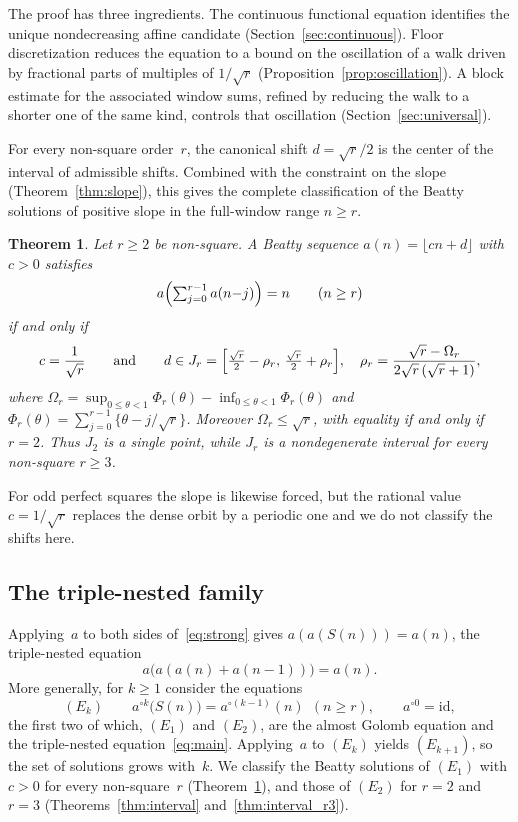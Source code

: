 \documentclass{birkjour}
\newtheorem{theorem}{Theorem}
\theoremstyle{definition}
\theoremstyle{remark}
\newcommand{\fl}[1]{\lfloor #1 \rfloor}
\begin{document}
The proof has three ingredients.
The continuous functional equation
identifies the unique nondecreasing affine candidate
(Section~\ref{sec:continuous}).
Floor discretization reduces the equation
to a bound on the oscillation of a walk driven by fractional
parts of multiples of $1/\!\sqrt{r}$
(Proposition~\ref{prop:oscillation}).
A block estimate for the associated window sums, refined by
reducing the walk to a shorter one of the same kind, controls
that oscillation
(Section~\ref{sec:universal}).

For every non-square order~$r$, the canonical shift
$d=\sqrt{r}/2$ is the center of the interval of admissible
shifts. Combined with the constraint on the slope
(Theorem~\ref{thm:slope}), this gives the complete
classification of the Beatty solutions of positive slope in
the full-window range $n\ge r$.

\begin{theorem}\label{thm:shift_interval}
Let $r\ge 2$ be non-square. A
Beatty sequence $a(n)=\fl{cn+d}$ with $c>0$ satisfies
\[
  a\Bigl(\textstyle\sum_{j=0}^{r-1}a(n{-}j)\Bigr)=n
  \qquad(n\ge r)
\]
if and only if
\[
  c=\frac{1}{\sqrt{r}}
  \qquad\text{and}\qquad
  d\in J_{r}
  =\Bigl[\tfrac{\sqrt{r}}{2}-\rho_{r},\,
         \tfrac{\sqrt{r}}{2}+\rho_{r}\Bigr],
  \quad
  \rho_{r}=\frac{\sqrt{r}-\Omega_{r}}{2\sqrt{r}\,(\sqrt{r}+1)},
\]
where $\Omega_{r}=\sup_{0\le\theta<1}\Phi_{r}(\theta)
-\inf_{0\le\theta<1}\Phi_{r}(\theta)$ and
$\Phi_{r}(\theta)=\sum_{j=0}^{r-1}\{\theta-j/\!\sqrt{r}\}$.
Moreover $\Omega_{r}\le\sqrt{r}$, with equality if and only if
$r=2$. Thus $J_{2}$ is a single point, while $J_{r}$ is a
nondegenerate interval for every non-square $r\ge 3$.
\end{theorem}

For odd perfect squares the slope is likewise forced, but the
rational value $c=1/\!\sqrt{r}$ replaces the dense orbit by a
periodic one and we do not classify the shifts here.

\subsection{The triple-nested family}

Applying~$a$ to both sides of~\eqref{eq:strong}
gives $a(a(S(n)))=a(n)$, the triple-nested equation
\begin{equation}\label{eq:main}
  a\bigl(a(a(n)+a(n{-}1))\bigr)=a(n).
\end{equation}
More generally, for $k\ge 1$ consider the equations
\begin{equation}\label{eq:Ek}
  (E_{k})\qquad a^{\circ k}\bigl(S(n)\bigr)=a^{\circ(k-1)}(n)
  \ \ (n\ge r),\qquad a^{\circ 0}=\mathrm{id},
\end{equation}
the first two of which, $(E_{1})$ and $(E_{2})$, are the almost
Golomb equation and the triple-nested equation~\eqref{eq:main}.
Applying~$a$ to $(E_{k})$ yields $(E_{k+1})$, so the set of
solutions grows with~$k$. We classify the Beatty solutions
of $(E_{1})$ with $c>0$ for every non-square~$r$
(Theorem~\ref{thm:shift_interval}), and those of $(E_{2})$
for $r=2$ and $r=3$ (Theorems~\ref{thm:interval}
and~\ref{thm:interval_r3}).
\end{document}
